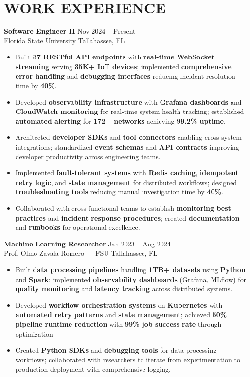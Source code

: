\documentclass[letterpaper,10pt]{article}
\newcommand{\resumeItem}[1]{\item\small #1}
\newcommand{\resumeSubheading}[4]{
  \vspace{6pt}
  \noindent
  \textbf{#1} \hfill {\footnotesize #2} \\
  [-1pt]
  \noindent
  \small #3 \hfill {\small #4}
  \vspace{3pt}
}
\newcommand{\resumeItemsStart}{\vspace{-2pt}\begin{itemize}}
\newcommand{\resumeItemsEnd}{\end{itemize}\vspace{6pt}}
\begin{document}
\section{\textcolor{metablue}{WORK EXPERIENCE}}
\vspace{-12pt}

\resumeSubheading
{Software Engineer II}{Nov 2024 -- Present}
{Florida State University}{Tallahassee, FL}
\resumeItemsStart
\resumeItem{Built \textbf{37 RESTful API endpoints} with \textbf{real-time WebSocket streaming} serving \textbf{35K+ IoT devices}; implemented \textbf{comprehensive error handling} and \textbf{debugging interfaces} reducing incident resolution time by \textbf{40\%}.}
\resumeItem{Developed \textbf{observability infrastructure} with \textbf{Grafana dashboards} and \textbf{CloudWatch monitoring} for real-time system health tracking; established \textbf{automated alerting} for \textbf{172+ networks} achieving \textbf{99.2\% uptime}.}
\resumeItem{Architected \textbf{developer SDKs} and \textbf{tool connectors} enabling cross-system integrations; standardized \textbf{event schemas} and \textbf{API contracts} improving developer productivity across engineering teams.}
\resumeItem{Implemented \textbf{fault-tolerant systems} with \textbf{Redis caching}, \textbf{idempotent retry logic}, and \textbf{state management} for distributed workflows; designed \textbf{troubleshooting tools} reducing manual investigation time by \textbf{40\%}.}
\resumeItem{Collaborated with cross-functional teams to establish \textbf{monitoring best practices} and \textbf{incident response procedures}; created \textbf{documentation} and \textbf{runbooks} for operational excellence.}
\resumeItemsEnd
\vspace{-12pt}

\resumeSubheading
{Machine Learning Researcher}{Jan 2023 -- Aug 2024}
{Prof. Olmo Zavala Romero — FSU}{Tallahassee, FL}
\resumeItemsStart
\resumeItem{Built \textbf{data processing pipelines} handling \textbf{1TB+ datasets} using \textbf{Python} and \textbf{Spark}; implemented \textbf{observability dashboards} (Grafana, MLflow) for \textbf{quality monitoring} and \textbf{latency tracking} across distributed systems.}
\resumeItem{Developed \textbf{workflow orchestration systems} on \textbf{Kubernetes} with \textbf{automated retry patterns} and \textbf{state management}; achieved \textbf{50\% pipeline runtime reduction} with \textbf{99\% job success rate} through optimization.}
\resumeItem{Created \textbf{Python SDKs} and \textbf{debugging tools} for data processing workflows; collaborated with researchers to iterate from experimentation to production deployment with comprehensive logging.}
\resumeItemsEnd
\vspace{-12pt}
\end{document}
